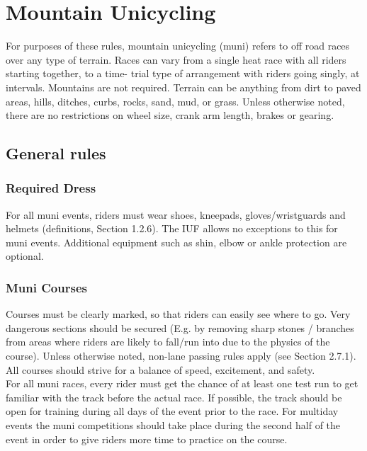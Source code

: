 \chapter{Mountain Unicycling}
\label{chap:muni}
For purposes of these rules, mountain unicycling (muni) refers to off road races
over any type of terrain. Races can vary from a single heat race with all riders
starting together, to a time- trial type of arrangement with riders going
singly, at intervals. Mountains are not required. Terrain can be anything from
dirt to paved areas, hills, ditches, curbs, rocks, sand, mud, or grass. Unless
otherwise noted, there are no restrictions on wheel size, crank arm length,
brakes or gearing.


\section{General rules}
\label{sec:muni-general}


\subsection{Required Dress}
\label{sec:muni-general}
For all muni events, riders must wear shoes, kneepads, gloves/wristguards and
helmets (definitions, Section 1.2.6). %
The IUF allows no exceptions to this for muni events. Additional equipment such
as shin, elbow or ankle protection are optional.


\subsection{Muni Courses}
\label{sec:muni-courses}
Courses must be clearly marked, so that riders can easily see where to go. Very
dangerous sections should be secured (E.g. by removing sharp stones / branches
from areas where riders are likely to fall/run into due to the physics of the
course). Unless otherwise noted, non-lane passing rules apply (see Section
2.7.1). %
All courses should strive for a balance of speed, excitement, and
safety.\\
For all muni races, every rider must get the chance of at least one test run to
get familiar with the track before the actual race. If possible, the track
should be open for training during all days of the event prior to the race. For
multiday events the muni competitions should take place during the second half
of the event in order to give riders more time to practice on the course.

